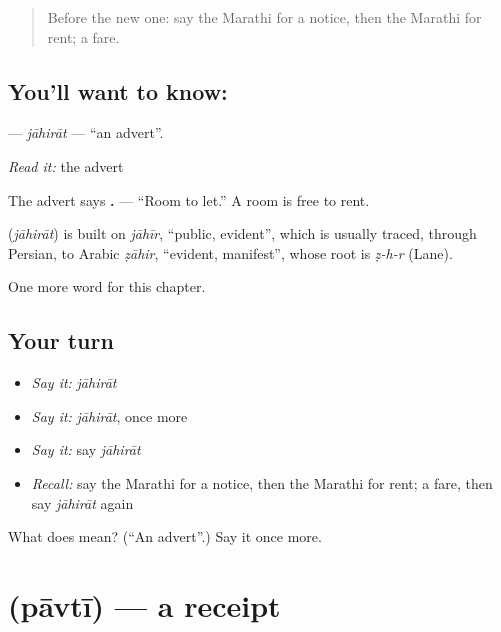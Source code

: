 \begin{quote}
Before the new one: say the Marathi for a notice, then the Marathi for rent; a fare.
\end{quote}

\subsection*{You'll want to know: }
\textbf{} — \emph{jāhirāt} — \textquotedblleft{}an advert\textquotedblright{}.

\emph{Read it:} the advert

The advert says \textbf{   .} — \textquotedblleft{}Room to let.\textquotedblright{} A room is free to rent.

\begin{cousinweb}
\textbf{} (\emph{jāhirāt}) is built on \emph{jāhīr}, \textquotedblleft{}public, evident\textquotedblright{}, which is usually traced, through Persian, to Arabic \emph{ẓāhir}, \textquotedblleft{}evident, manifest\textquotedblright{}, whose root is \emph{ẓ-h-r} (Lane).
\end{cousinweb}

\begin{grammarlens}[title={What you've built}]
One more word for this chapter.
\end{grammarlens}

\subsection*{Your turn}
\begin{itemize}
\raggedright
  \item \emph{Say it:} \emph{jāhirāt}
  \item \emph{Say it:} \emph{jāhirāt}, once more
  \item \emph{Say it:} say \emph{jāhirāt}
  \item \emph{Recall:} say the Marathi for a notice, then the Marathi for rent; a fare, then say \emph{jāhirāt} again
\end{itemize}

\begin{tcolorbox}[breakable,colback=teal!4,colframe=teal!35!black,title={Before you move on}]
What does  mean? (\textquotedblleft{}An advert\textquotedblright{}.) Say it once more.
\end{tcolorbox}
\section[\texorpdfstring{\mr{पावती} (pāvtī)}{पावती (pāvtī)}]{ (pāvtī) — a receipt}

